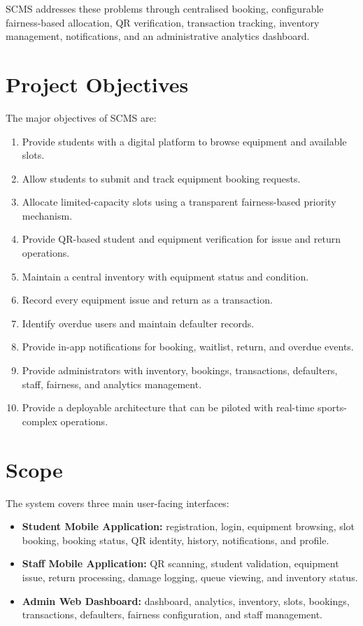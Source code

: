 \documentclass[12pt,a4paper,oneside]{report}
\begin{document}
SCMS addresses these problems through centralised booking, configurable fairness-based allocation, QR verification, transaction tracking, inventory management, notifications, and an administrative analytics dashboard.

\section{Project Objectives}

The major objectives of SCMS are:

\begin{enumerate}
    \item Provide students with a digital platform to browse equipment and available slots.
    \item Allow students to submit and track equipment booking requests.
    \item Allocate limited-capacity slots using a transparent fairness-based priority mechanism.
    \item Provide QR-based student and equipment verification for issue and return operations.
    \item Maintain a central inventory with equipment status and condition.
    \item Record every equipment issue and return as a transaction.
    \item Identify overdue users and maintain defaulter records.
    \item Provide in-app notifications for booking, waitlist, return, and overdue events.
    \item Provide administrators with inventory, bookings, transactions, defaulters, staff, fairness, and analytics management.
    \item Provide a deployable architecture that can be piloted with real-time sports-complex operations.
\end{enumerate}

\section{Scope}

The system covers three main user-facing interfaces:

\begin{itemize}
    \item \textbf{Student Mobile Application:} registration, login, equipment browsing, slot booking, booking status, QR identity, history, notifications, and profile.
    \item \textbf{Staff Mobile Application:} QR scanning, student validation, equipment issue, return processing, damage logging, queue viewing, and inventory status.
    \item \textbf{Admin Web Dashboard:} dashboard, analytics, inventory, slots, bookings, transactions, defaulters, fairness configuration, and staff management.
\end{itemize}
\end{document}
